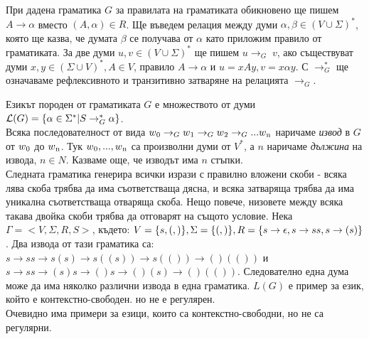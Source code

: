 \documentclass[11pt]{article}
\begin{document}
При дадена граматика $G$ за правилата на граматиката обикновено ще пишем $A \to \alpha$ вместо $(A, \alpha) \in R$. Ще въведем релация между думи $\alpha, \beta \in (V \cup \Sigma)^{*}$, която ще казва, че думата $\beta$ се получава от $\alpha$ като приложим правило от граматиката. За две думи $u, v \in (V \cup \Sigma)^{*}$ ще пишем $u \to_{G}\;v$, ако съществуват думи $x, y \in (\Sigma \cup V)^{*}, A \in V$, правило $A \to \alpha$ и $u = xAy, v = x \alpha y$. С $\to^{*}_{G}$ ще означаваме рефлексивното и транзитивно затваряне на релацията $\to_{G}$.

Езикът породен от граматиката $G$ е множеството от думи $\mathcal{L}(G)=\{\alpha \in \Sigma^{*} | S \to^{*}_{G}\alpha\}$.\\

Всяка последователност от вида $w\textsubscript{0}\to_{G}w\textsubscript{1}\to_{G}w\textsubscript{2}\to_{G}... w\textsubscript{n}$ наричаме \textit{извод} в  $G$ от $w\textsubscript{0}$ до $w\textsubscript{n}$. Тук $w\textsubscript{0}, ..., w\textsubscript{n}$ са произволни думи от $V^*$, а $n$ наричаме \textit{дължина} на извода, $n\in N$. Казваме още, че изводът има $n$ стъпки. \\

\sample Следната граматика генерира всички изрази с правилно вложени скоби - всяка лява скоба трябва да има съответстваща дясна, и всяка затваряща трябва да има уникална съответстваща отваряща скоба. Нещо повече, низовете между всяка такава двойка скоби трябва да отговарят на същото условие. Нека $\Gamma = < V, \Sigma, R, S>$, където: $V = \{{ s, (, )}\}, \Sigma = \{{(,)}\}, R = \{ {s\to\epsilon, s\to ss, s\to(s)}\}$. Два извода от тази граматика са:
$s \to ss \to s(s) \to s((s)) \to s(()) \to ()(())$ и $s \to ss \to (s)s \to ()s \to ()(s) \to ()(())$.
Следователно една дума може да има няколко различни извода в една граматика. $L(G)$ е пример за език, който е контекстно-свободен. но не е регулярен.\\
Очевидно има примери за езици, които са контекстно-свободни, но не са регулярни. 
\end{document}
